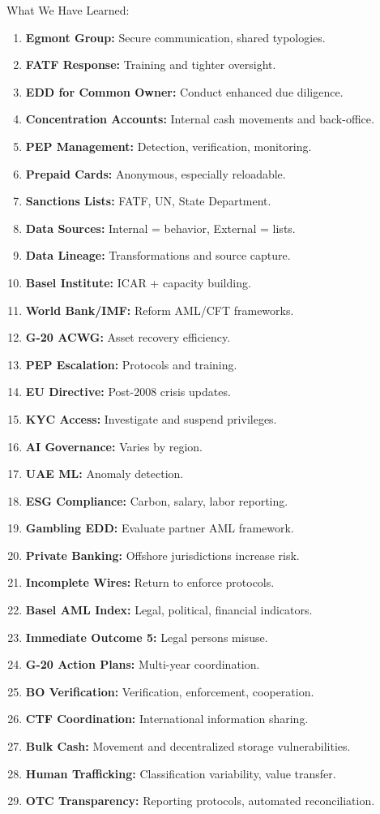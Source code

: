 \documentclass[12pt,aspectratio=169]{beamer}
\begin{document}
\begin{frame}
\begin{block}{\fontsize{11}{13}\selectfont What We Have Learned:}
\begin{enumerate}
    \item \textbf{Egmont Group:} Secure communication, shared typologies.
    \item \textbf{FATF Response:} Training and tighter oversight.
    \item \textbf{EDD for Common Owner:} Conduct enhanced due diligence.
    \item \textbf{Concentration Accounts:} Internal cash movements and back-office.
    \item \textbf{PEP Management:} Detection, verification, monitoring.
    \item \textbf{Prepaid Cards:} Anonymous, especially reloadable.
    \item \textbf{Sanctions Lists:} FATF, UN, State Department.
    \item \textbf{Data Sources:} Internal = behavior, External = lists.
    \item \textbf{Data Lineage:} Transformations and source capture.
    \item \textbf{Basel Institute:} ICAR + capacity building.
    \item \textbf{World Bank/IMF:} Reform AML/CFT frameworks.
    \item \textbf{G-20 ACWG:} Asset recovery efficiency.
    \item \textbf{PEP Escalation:} Protocols and training.
    \item \textbf{EU Directive:} Post-2008 crisis updates.
    \item \textbf{KYC Access:} Investigate and suspend privileges.
    \item \textbf{AI Governance:} Varies by region.
    \item \textbf{UAE ML:} Anomaly detection.
    \item \textbf{ESG Compliance:} Carbon, salary, labor reporting.
    \item \textbf{Gambling EDD:} Evaluate partner AML framework.
    \item \textbf{Private Banking:} Offshore jurisdictions increase risk.
    \item \textbf{Incomplete Wires:} Return to enforce protocols.
    \item \textbf{Basel AML Index:} Legal, political, financial indicators.
    \item \textbf{Immediate Outcome 5:} Legal persons misuse.
    \item \textbf{G-20 Action Plans:} Multi-year coordination.
    \item \textbf{BO Verification:} Verification, enforcement, cooperation.
    \item \textbf{CTF Coordination:} International information sharing.
    \item \textbf{Bulk Cash:} Movement and decentralized storage vulnerabilities.
    \item \textbf{Human Trafficking:} Classification variability, value transfer.
    \item \textbf{OTC Transparency:} Reporting protocols, automated reconciliation.
\end{enumerate}
\end{block}


\end{frame}
\end{document}
